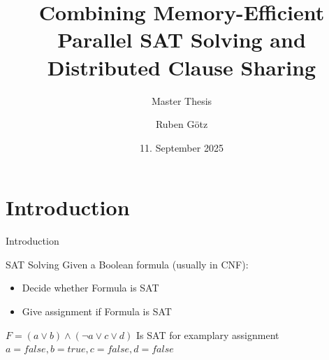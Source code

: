 \documentclass[]{sdqbeamer}
\title{Combining Memory-Efficient Parallel SAT Solving and Distributed Clause Sharing}
\subtitle{Master Thesis}
\author{Ruben Götz}
\date[11.\,9.\,2025]{11. September 2025}
\begin{document}
\begin{frame}[title white vertical, picture=images/palladio_bauplan]
	\titlepage
\end{frame}


\section{Introduction}
\begin{frame}{Introduction}
    \begin{block}{SAT Solving}
        Given a Boolean formula (usually in CNF):
        \begin{itemize}
            \item Decide whether Formula is SAT
            \item Give assignment if Formula is SAT
        \end{itemize}
    \end{block}

    \begin{exampleblock}{$F = (a \lor b) \land (\lnot a \lor c \lor d)$}
        Is SAT for examplary assignment $a = false, b = true, c = false, d = false$
    \end{exampleblock}
\end{frame}
\end{document}
